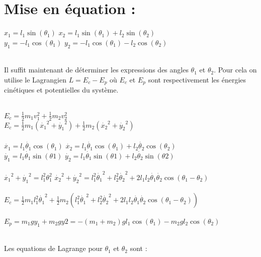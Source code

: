 \documentclass{article}
\begin{document}
\section{Mise en équation :}
\begin{large}
\noindent $x_{1}=l_{1}\sin(\theta_{1})$ \qquad $x_{2}=l_{1}\sin(\theta_{1})+l_{2}\sin(\theta_{2})$\\
$y_{1}=-l_{1}\cos(\theta_{1})$ \quad  $y_{2}=-l_{1}\cos(\theta_{1})-l_{2}\cos(\theta_{2})$\\
\\
\end{large}
Il suffit maintenant de déterminer les expressions des angles $\theta_{1}$ et $\theta_{2}$. Pour cela on utilise le Lagrangien $L=E_{c}-E_{p}$ où $E_{c}$ et $E_{p}$ sont respectivement les énergies cinétiques et potentielles du système.\\
\\
\begin{large}
$E_{c}=\frac{1}{2}m_{1}v_{1}^{2}+\frac{1}{2}m_{2}v_{2}^{2}$\\
$E_{c}=\frac{1}{2}m_{1}(\dot{x_{1}}^{2}+\dot{y_{1}}^{2})+\frac{1}{2}m_{2}(\dot{x_{2}}^{2}+\dot{y_{2}}^{2})$\\
\\
$\dot{x_{1}}=l_{1}\dot{\theta_{1}}\cos(\theta_{1})$ \qquad $\dot{x_{2}}=l_{1}\dot{\theta_{1}}\cos(\theta_{1})+l_{2}\dot{\theta_{2}}\cos(\theta_{2})$\\
$\dot{y_{1}}=l_{1}\dot{\theta_{1}}\sin(\theta{1})$ \qquad $\dot{y_{2}}=l_{1}\dot{\theta_{1}}\sin(\theta{1})+l_{2}\dot{\theta_{2}}\sin(\theta{2})$\\
\\
$\dot{x_{1}}^{2}+\dot{y_{1}}^{2}=l_{1}^2\theta_{1}^{2}$ \qquad $\dot{x_{2}}^{2}+\dot{y_{2}}^{2}=l_1^2\dot{\theta_1}^2+l_2^2\dot{\theta_2}^2+2l_1l_2\dot{\theta_1}\dot{\theta_2}\cos(\theta_1-\theta_2)$\\
\\
$E_{c} = \frac{1}{2}m_1l_1^2\dot{\theta_1}^2+\frac{1}{2}m_2\left(l_1^2\dot{\theta_1}^2+l_2^2\dot{\theta_2}^2+2l_1l_2\dot{\theta_1}\dot{\theta_2}\cos(\theta_1-\theta_2)\right)$\\
\\
$E_{p}=m_{1}gy_{1}+m_{2}gy{2}=-(m_{1}+m_{2})gl_{1}\cos(\theta_{1})-m_{2}gl_{2}\cos(\theta_{2})$\\
\\
\end{large}
Les equations de Lagrange pour $\theta_{1}$ et $\theta_{2}$ sont : \\
\\
\end{document}
